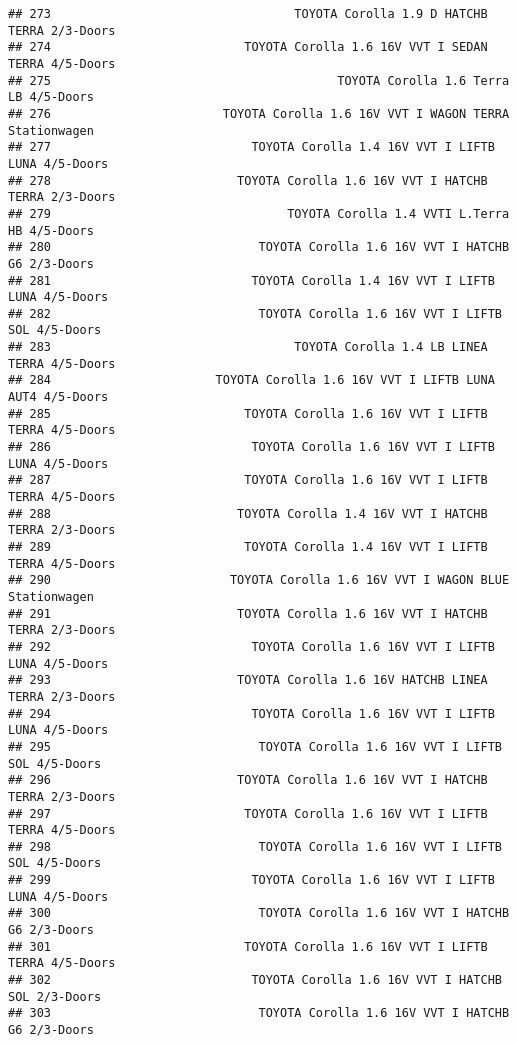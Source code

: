 \documentclass[]{article}
\begin{document}
\begin{verbatim}
## 273                                  TOYOTA Corolla 1.9 D HATCHB TERRA 2/3-Doors
## 274                           TOYOTA Corolla 1.6 16V VVT I SEDAN TERRA 4/5-Doors
## 275                                        TOYOTA Corolla 1.6 Terra LB 4/5-Doors
## 276                        TOYOTA Corolla 1.6 16V VVT I WAGON TERRA Stationwagen
## 277                            TOYOTA Corolla 1.4 16V VVT I LIFTB LUNA 4/5-Doors
## 278                          TOYOTA Corolla 1.6 16V VVT I HATCHB TERRA 2/3-Doors
## 279                                 TOYOTA Corolla 1.4 VVTI L.Terra HB 4/5-Doors
## 280                             TOYOTA Corolla 1.6 16V VVT I HATCHB G6 2/3-Doors
## 281                            TOYOTA Corolla 1.4 16V VVT I LIFTB LUNA 4/5-Doors
## 282                             TOYOTA Corolla 1.6 16V VVT I LIFTB SOL 4/5-Doors
## 283                                  TOYOTA Corolla 1.4 LB LINEA TERRA 4/5-Doors
## 284                       TOYOTA Corolla 1.6 16V VVT I LIFTB LUNA AUT4 4/5-Doors
## 285                           TOYOTA Corolla 1.6 16V VVT I LIFTB TERRA 4/5-Doors
## 286                            TOYOTA Corolla 1.6 16V VVT I LIFTB LUNA 4/5-Doors
## 287                           TOYOTA Corolla 1.6 16V VVT I LIFTB TERRA 4/5-Doors
## 288                          TOYOTA Corolla 1.4 16V VVT I HATCHB TERRA 2/3-Doors
## 289                           TOYOTA Corolla 1.4 16V VVT I LIFTB TERRA 4/5-Doors
## 290                         TOYOTA Corolla 1.6 16V VVT I WAGON BLUE Stationwagen
## 291                          TOYOTA Corolla 1.6 16V VVT I HATCHB TERRA 2/3-Doors
## 292                            TOYOTA Corolla 1.6 16V VVT I LIFTB LUNA 4/5-Doors
## 293                          TOYOTA Corolla 1.6 16V HATCHB LINEA TERRA 2/3-Doors
## 294                            TOYOTA Corolla 1.6 16V VVT I LIFTB LUNA 4/5-Doors
## 295                             TOYOTA Corolla 1.6 16V VVT I LIFTB SOL 4/5-Doors
## 296                          TOYOTA Corolla 1.6 16V VVT I HATCHB TERRA 2/3-Doors
## 297                           TOYOTA Corolla 1.6 16V VVT I LIFTB TERRA 4/5-Doors
## 298                             TOYOTA Corolla 1.6 16V VVT I LIFTB SOL 4/5-Doors
## 299                            TOYOTA Corolla 1.6 16V VVT I LIFTB LUNA 4/5-Doors
## 300                             TOYOTA Corolla 1.6 16V VVT I HATCHB G6 2/3-Doors
## 301                           TOYOTA Corolla 1.6 16V VVT I LIFTB TERRA 4/5-Doors
## 302                            TOYOTA Corolla 1.6 16V VVT I HATCHB SOL 2/3-Doors
## 303                             TOYOTA Corolla 1.6 16V VVT I HATCHB G6 2/3-Doors

\end{verbatim}
\end{document}
